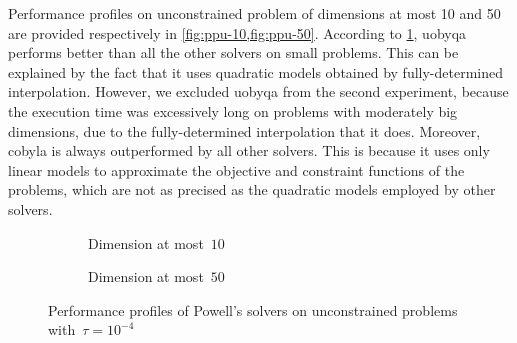 Performance profiles on unconstrained problem of dimensions at most \num{10} and \num{50} are provided respectively in \cref{fig:ppu-10,fig:ppu-50}.
According to \cref{fig:ppu-10}, \gls{uobyqa} performs better than all the other solvers on small problems.
This can be explained by the fact that it uses quadratic models obtained by fully-determined interpolation.
However, we excluded \gls{uobyqa} from the second experiment, because the execution time was excessively long on problems with moderately big dimensions, due to the fully-determined interpolation that it does.
Moreover, \gls{cobyla} is always outperformed by all other solvers.
This is because it uses only linear models to approximate the objective and constraint functions of the problems, which are not as precised as the quadratic models employed by other solvers.

\begin{figure}[ht]
    \begin{subfigure}[b]{0.49\textwidth}
        \centering
        \caption{Dimension at most~$10$}
        \label{fig:ppu-10}
    \end{subfigure}
    \hfill
    \begin{subfigure}[b]{0.49\textwidth}
        \centering
        \caption{Dimension at most~$50$}
        \label{fig:ppu-50}
    \end{subfigure}
    \caption{Performance profiles of Powell's  solvers on unconstrained problems with~$\tau = 10^{-4}$}
\end{figure}

